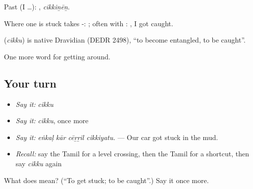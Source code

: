 Past (I …): , \emph{cikkiṉēṉ}.

Where one is stuck takes -:  ; often with : , I got caught.

\begin{cousinweb}
\textbf{} (\emph{cikku}) is native Dravidian (DEDR 2498), \textquotedblleft{}to become entangled, to be caught\textquotedblright{}.
\end{cousinweb}

\begin{grammarlens}[title={What you've built}]
One more word for getting around.
\end{grammarlens}

\subsection*{Your turn}
\begin{itemize}
\raggedright
  \item \emph{Say it:} \emph{cikku}
  \item \emph{Say it:} \emph{cikku}, once more
  \item \emph{Say it:} \emph{eṅkaḷ kār cēṟṟil cikkiyatu.} — Our car got stuck in the mud.
  \item \emph{Recall:} say the Tamil for a level crossing, then the Tamil for a shortcut, then say \emph{cikku} again
\end{itemize}

\begin{tcolorbox}[breakable,colback=teal!4,colframe=teal!35!black,title={Before you move on}]
What does  mean? (\textquotedblleft{}To get stuck; to be caught\textquotedblright{}.) Say it once more.
\end{tcolorbox}
